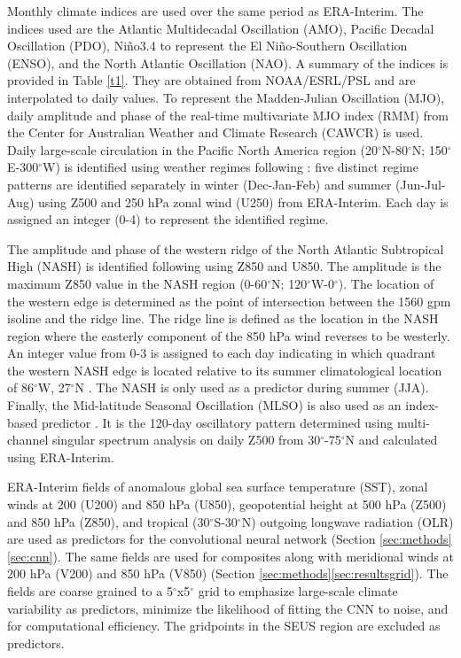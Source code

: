 \documentclass{ametsocV6.1}
\begin{document}
Monthly climate indices are used over the same period as ERA-Interim.  The indices used are the Atlantic Multidecadal Oscillation (AMO), Pacific Decadal Oscillation (PDO), Ni\~{n}o3.4 to represent the El Ni\~{n}o-Southern Oscillation (ENSO), and the North Atlantic Oscillation (NAO).  A summary of the indices is provided in Table \ref{t1}.  They are obtained from NOAA/ESRL/PSL and are interpolated to daily values. To represent the Madden-Julian Oscillation (MJO), daily amplitude and phase of the real-time multivariate MJO index (RMM) from the Center for Australian Weather and Climate Research (CAWCR) \citep{wheeler_all-season_2004} is used. Daily large-scale circulation in the Pacific North America region (20$^\circ$N-80$^\circ$N; 150$^\circ$E-300$^\circ$W) is identified using weather regimes following \citet{amini_control_2019}: five distinct regime patterns are identified separately in winter (Dec-Jan-Feb) and summer (Jun-Jul-Aug) using Z500 and 250 hPa zonal wind (U250) from ERA-Interim.  Each day is assigned an integer (0-4) to represent the identified regime. 

The amplitude and phase of the western ridge of the North Atlantic Subtropical High (NASH) is identified following \citet{li_contribution_2015} using Z850 and U850. The amplitude is the maximum Z850 value in the NASH region (0-60$^\circ$N; 120$^\circ$W-0$^\circ$). The location of the western edge is determined as the point of intersection between the 1560 gpm isoline and the ridge line.  The ridge line is defined as the location in the NASH region where the easterly component of the 850 hPa wind reverses to be westerly.  An integer value from 0-3 is assigned to each day indicating in which quadrant the western NASH edge is located relative to its summer climatological location of 86$^\circ$W, 27$^\circ$N \citep{li_contribution_2015}. The NASH is only used as a predictor during summer (JJA). Finally, the Mid-latitude Seasonal Oscillation (MLSO) is also used as an index-based predictor \citep{stan_intra-seasonal_2019}. It is the 120-day oscillatory pattern determined using multi-channel singular spectrum analysis on daily Z500 from 30$^\circ$-75$^\circ$N and calculated using ERA-Interim. 

ERA-Interim fields of anomalous global sea surface temperature (SST), zonal winds at 200 (U200) and 850 hPa (U850), geopotential height at 500 hPa (Z500) and 850 hPa (Z850), and tropical (30$^\circ$S-30$^\circ$N) outgoing longwave radiation (OLR) are used as predictors for the convolutional neural network (Section \ref{sec:methods}\ref{sec:cnn}). The same fields are used for composites along with meridional winds at 200 hPa (V200) and 850 hPa (V850) (Section \ref{sec:methods}\ref{sec:resultsgrid}).  The fields are coarse grained to a 5$^\circ$x5$^\circ$ grid to emphasize large-scale climate variability as predictors, minimize the likelihood of fitting the CNN to noise, and for computational efficiency. The gridpoints in the SEUS region are excluded as predictors.  
\end{document}
